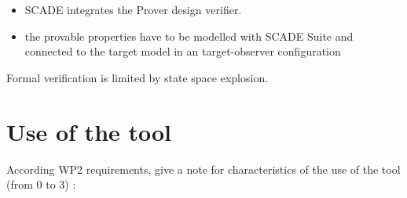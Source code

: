 \begin{itemize}
	\item SCADE integrates the Prover design verifier. 
	\item the provable properties have to be modelled with SCADE Suite and connected to the target model in an target-observer configuration
\end{itemize}


\begin{assessor1}
  Formal verification is limited by state space explosion.
\end{assessor1}

\section{Use of the tool}


According WP2 requirements, give a note for characteristics of the use of the tool (from 0 to 3) :

